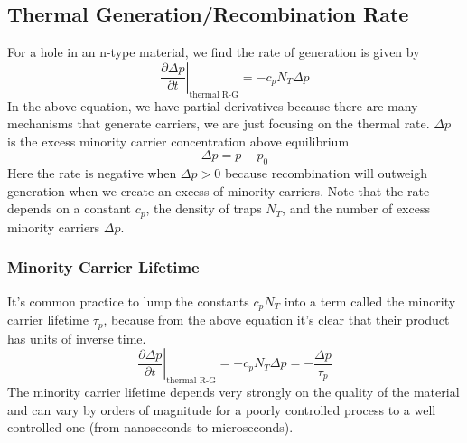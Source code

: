 \subsection{Thermal Generation/Recombination Rate}
For a hole in an n-type material, we find the rate of generation is given by
\begin{equation}
	\left. \frac{\partial \Delta p}{\partial t} \right|_{\text{thermal R-G}} = - c_p N_T \Delta p
\end{equation}
In the above equation, we have partial derivatives because there are many mechanisms that generate carriers, we are just focusing on the thermal rate.  $\Delta p$ is the excess minority carrier concentration above equilibrium
\begin{equation}
	\Delta p = p - p_0
\end{equation}
Here the rate is negative when $\Delta p > 0$ because recombination will outweigh generation when we create an excess of minority carriers.  Note that the rate depends on a constant $c_p$, the density of traps $N_T$, and the number of excess minority carriers $\Delta p$.  
\subsubsection*{Minority Carrier Lifetime}
It's common practice to lump the constants $c_p N_T$ into a term called the minority carrier lifetime $\tau_p$, because from the above equation it's clear that their product has units of inverse time.
 \begin{equation}
	\left. \frac{\partial \Delta p}{\partial t} \right|_{\text{thermal R-G}} = - c_p N_T \Delta p = - \frac{\Delta p}{\tau_p}
	\label{eq:lifetime}
\end{equation} 
The minority carrier lifetime depends very strongly on the quality of the material and can vary by orders of magnitude for a poorly controlled process to a well controlled one (from nanoseconds to microseconds).
